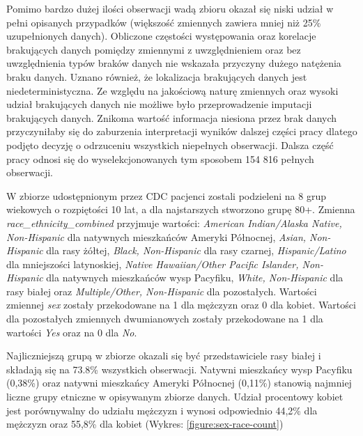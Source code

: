 \documentclass[polish, twoside, 12pt, a4paper]{article}
\theoremstyle{definition}
\theoremstyle{plain}
\theoremstyle{remark}
\begin{document}
Pomimo bardzo dużej ilości obserwacji wadą zbioru okazał się niski udział w pełni opisanych przypadków (większość zmiennych zawiera mniej niż 25\% uzupełnionych danych). Obliczone częstości występowania oraz korelacje brakujących danych pomiędzy zmiennymi z uwzględnieniem oraz bez uwzględnienia typów braków danych nie wskazała przyczyny dużego natężenia braku danych. Uznano również, że lokalizacja brakujących danych jest niedeterministyczna. Ze względu na jakościową naturę zmiennych oraz wysoki udział brakujących danych nie możliwe było przeprowadzenie imputacji brakujących danych. Znikoma wartość informacja niesiona przez brak danych przyczyniłaby się do zaburzenia interpretacji wyników dalszej części pracy dlatego podjęto decyzję o odrzuceniu wszystkich niepełnych obserwacji. Dalsza część pracy odnosi się do wyselekcjonowanych tym sposobem 154 816 pełnych obserwacji. 

W zbiorze udostępnionym przez CDC pacjenci zostali podzieleni na 8 grup wiekowych o rozpiętości 10 lat, a dla najstarszych stworzono grupę 80+. Zmienna \emph{race\_ethnicity\_combined} przyjmuje wartości: \emph{American Indian/Alaska Native, Non-Hispanic} dla natywnych mieszkańców Ameryki Północnej, \emph{Asian, Non-Hispanic} dla rasy żółtej, \emph{Black, Non-Hispanic} dla rasy czarnej, \emph{Hispanic/Latino} dla mniejszości latynoskiej, \emph{Native Hawaiian/Other Pacific Islander, Non-Hispanic} dla natywnych mieszkańców wysp Pacyfiku, \emph{White, Non-Hispanic} dla rasy białej oraz \emph{Multiple/Other, Non-Hispanic} dla pozostałych. Wartości zmiennej \emph{sex} zostały przekodowane na 1 dla mężczyzn oraz 0 dla kobiet. Wartości dla pozostałych zmiennych dwumianowych zostały przekodowane na 1 dla wartości \emph{Yes} oraz na 0 dla \emph{No}.

Najliczniejszą grupą w zbiorze okazali się być przedstawiciele rasy białej i składają się na 73.8\% wszystkich obserwacji. Natywni mieszkańcy wysp Pacyfiku (0,38\%) oraz natywni mieszkańcy Ameryki Północnej (0,11\%) stanowią najmniej liczne grupy etniczne w opisywanym zbiorze danych. Udział procentowy kobiet jest porównywalny do udziału mężczyzn i wynosi odpowiednio 44,2\% dla mężczyzn oraz 55,8\% dla kobiet (Wykres: \ref{figure:sex-race-count})
\end{document}
